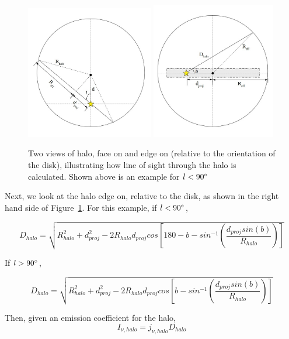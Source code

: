 \documentclass[letterpaper, 10pt]{article}
\begin{document}
\begin{figure}[h]
\begin{center}
\includegraphics[width=0.495\textwidth]{halo_face.jpg}
\includegraphics[width=0.485\textwidth]{halo_edge.jpg}
\caption{Two views of halo, face on and edge on (relative to the orientation of the disk), illustrating how line of sight through the halo is calculated. Shown above is an example for $ l < 90\degree$}
\label{halo}
\end{center}
\end{figure}

Next, we look at the halo edge on, relative to the disk, as shown in the right hand side of Figure~\ref{halo}.  For this example, if $ l < 90\degree$, 

\[ D_{halo} = \sqrt{R_{halo}^{2} + d_{proj}^{2} - 2R_{halo}d_{proj}cos\left[180 - b - sin^{-1}\left(\frac{d_{proj}sin(b)}{R_{halo}}\right)\right] }  \]

If $l > 90\degree$, 

\[ D_{halo} = \sqrt{R_{halo}^{2} + d_{proj}^{2} - 2R_{halo}d_{proj}cos\left[b - sin^{-1}\left(\frac{d_{proj}sin(b)}{R_{halo}}\right)\right] }  \]

Then, given an emission coefficient for the halo, 
\[I_{\nu, halo} = j_{\nu, halo}D_{halo} \]
\end{document}
